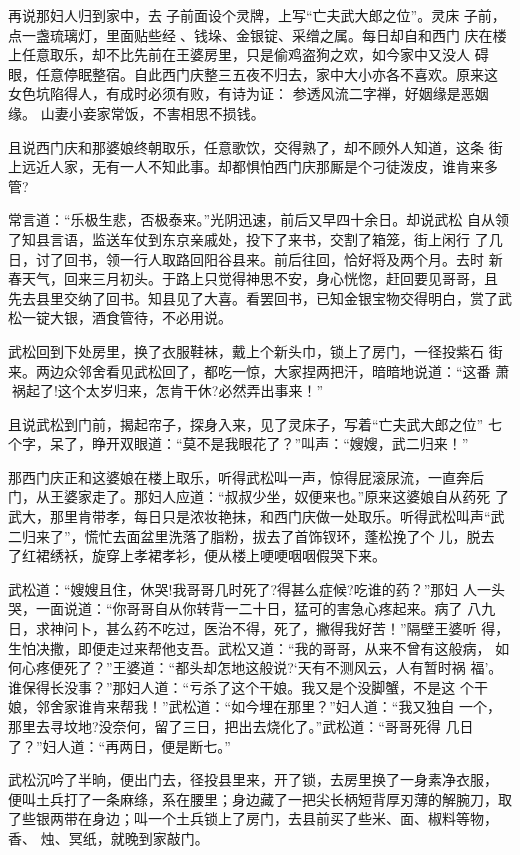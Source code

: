 再说那妇人归到家中，去子前面设个灵牌，上写“亡夫武大郎之位”。灵床
子前，点一盏琉璃灯，里面贴些经、钱垛、金银锭、采缯之属。每日却自和西门
庆在楼上任意取乐，却不比先前在王婆房里，只是偷鸡盗狗之欢，如今家中又没人
碍眼，任意停眠整宿。自此西门庆整三五夜不归去，家中大小亦各不喜欢。原来这
女色坑陷得人，有成时必须有败，有诗为证：
参透风流二字禅，好姻缘是恶姻缘。
山妻小妾家常饭，不害相思不损钱。

且说西门庆和那婆娘终朝取乐，任意歌饮，交得熟了，却不顾外人知道，这条
街上远近人家，无有一人不知此事。却都惧怕西门庆那厮是个刁徒泼皮，谁肯来多
管?

常言道：“乐极生悲，否极泰来。”光阴迅速，前后又早四十余日。却说武松
自从领了知县言语，监送车仗到东京亲戚处，投下了来书，交割了箱笼，街上闲行
了几日，讨了回书，领一行人取路回阳谷县来。前后往回，恰好将及两个月。去时
新春天气，回来三月初头。于路上只觉得神思不安，身心恍惚，赶回要见哥哥，且
先去县里交纳了回书。知县见了大喜。看罢回书，已知金银宝物交得明白，赏了武
松一锭大银，酒食管待，不必用说。

武松回到下处房里，换了衣服鞋袜，戴上个新头巾，锁上了房门，一径投紫石
街来。两边众邻舍看见武松回了，都吃一惊，大家捏两把汗，暗暗地说道：“这番
萧祸起了!这个太岁归来，怎肯干休?必然弄出事来！”

且说武松到门前，揭起帘子，探身入来，见了灵床子，写着“亡夫武大郎之位”
七个字，呆了，睁开双眼道：“莫不是我眼花了？”叫声：“嫂嫂，武二归来！”

那西门庆正和这婆娘在楼上取乐，听得武松叫一声，惊得屁滚尿流，一直奔后
门，从王婆家走了。那妇人应道：“叔叔少坐，奴便来也。”原来这婆娘自从药死
了武大，那里肯带孝，每日只是浓妆艳抹，和西门庆做一处取乐。听得武松叫声“武
二归来了”，慌忙去面盆里洗落了脂粉，拔去了首饰钗环，蓬松挽了个儿，脱去
了红裙绣袄，旋穿上孝裙孝衫，便从楼上哽哽咽咽假哭下来。

武松道：“嫂嫂且住，休哭!我哥哥几时死了?得甚么症候?吃谁的药？”那妇
人一头哭，一面说道：“你哥哥自从你转背一二十日，猛可的害急心疼起来。病了
八九日，求神问卜，甚么药不吃过，医治不得，死了，撇得我好苦！”隔壁王婆听
得，生怕决撒，即便走过来帮他支吾。武松又道：“我的哥哥，从来不曾有这般病，
如何心疼便死了？”王婆道：“都头却怎地这般说?‘天有不测风云，人有暂时祸
福’。谁保得长没事？”那妇人道：“亏杀了这个干娘。我又是个没脚蟹，不是这
个干娘，邻舍家谁肯来帮我！”武松道：“如今埋在那里？”妇人道：“我又独自
一个，那里去寻坟地?没奈何，留了三日，把出去烧化了。”武松道：“哥哥死得
几日了？”妇人道：“再两日，便是断七。”

武松沉吟了半晌，便出门去，径投县里来，开了锁，去房里换了一身素净衣服，
便叫土兵打了一条麻绦，系在腰里；身边藏了一把尖长柄短背厚刃薄的解腕刀，取
了些银两带在身边；叫一个土兵锁上了房门，去县前买了些米、面、椒料等物，香、
烛、冥纸，就晚到家敲门。

